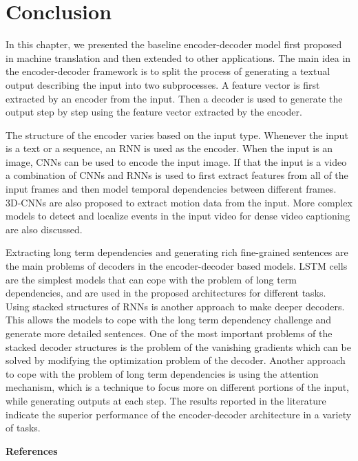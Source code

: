 \documentclass[preprint, 12pt]{elsarticle}
\begin{document}
		\section{Conclusion}
		In this chapter, we presented the baseline encoder-decoder model first proposed in machine translation and then extended to other applications. The main idea in the encoder-decoder framework is to split the process of generating a textual output describing the input into two subprocesses. A feature vector is first extracted by an encoder from the input. Then a decoder is used to generate the output step by step using the feature vector extracted by the encoder. 
		
		The structure of the encoder varies based on the input type. Whenever the input is a text or a sequence, an RNN is used as the encoder. When the input is an image, CNNs can be used to encode the input image. If that the input is a video a combination of CNNs and RNNs is used to first extract features from all of the input frames and then model temporal dependencies between different frames. 3D-CNNs are also proposed to extract motion data from the input. More complex models to detect and localize events in the input video for dense video captioning are also discussed.
		
		Extracting long term dependencies and generating rich fine-grained sentences are the main problems of decoders in the encoder-decoder based models. LSTM cells are the simplest models that can cope with the problem of long term dependencies, and are used in the proposed architectures for different tasks. Using stacked structures of RNNs is another approach to make deeper decoders. This allows the models to cope with the long term dependency challenge and generate more detailed sentences. One of the most important problems of the stacked decoder structures is the problem of the vanishing gradients which can be solved by modifying the optimization problem of the decoder. Another approach to cope with the problem of long term dependencies is using the attention mechanism, which is a technique to focus more on different portions of the input, while generating outputs at each step. The results reported in the literature indicate the superior performance of the encoder-decoder architecture in a variety of tasks.
		
	\begin{large}
		\textbf{References}
	\end{large}
		

	
	
\end{document}
